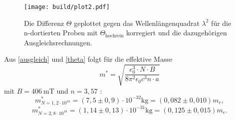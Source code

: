 \begin{figure}
    \texttt{[image: build/plot2.pdf]}
    \caption{Die Differenz $\Theta$ geplottet gegen das Wellenlängenquadrat $\lambda^2$
    für die n-dortierten Proben mit $\Theta_\text{hochrein}$ korregiert
    und die dazugehörigen Ausgleichsrechnungen.}
    \label{plot2}
\end{figure}

\noindent Aus \eqref{ausgleich} und \eqref{theta} folgt für die effektive Masse
\begin{equation}
    m^* = \sqrt{\frac{e^3_0 \cdot N \cdot B}{8 \pi^2 \epsilon_0 c^3 n \cdot a}}
\end{equation}
\noindent mit $B= \qty{406}{\milli \tesla }$ und $n= 3,57$ \cite{Galliumarsenid_n}:
\begin{equation*}
    m^*_{N=1,2 \cdot 10^{18}} = (7,5 \pm 0,9) \cdot 10^{-32} \si{\kg} 
    =  (0,082 \pm 0,010 )m_e,
\end{equation*}
\begin{equation*}
    m^*_{N=2,8 \cdot 10^{18}} = (1,14 \pm 0,13) \cdot 10^{-31} \si{\kg} 
    =  (0,125 \pm 0,015 )m_e.
\end{equation*}
